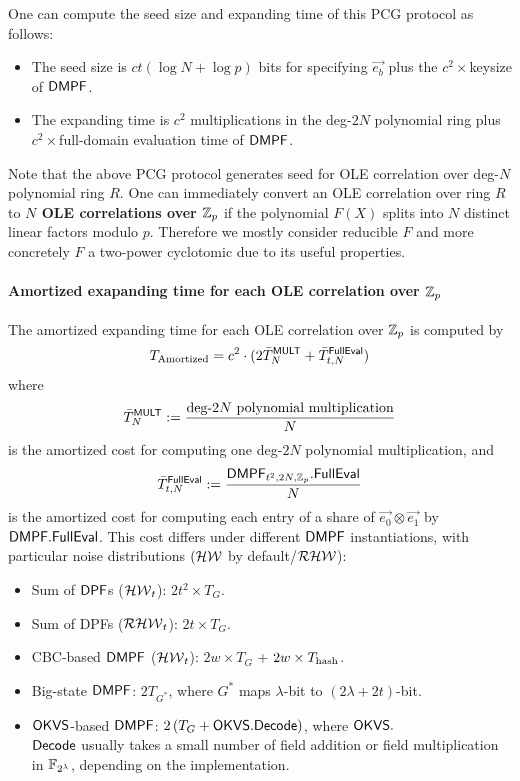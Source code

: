 One can compute the seed size and expanding time of this PCG protocol as follows: 
\begin{itemize}
    \item The seed size is $ct(\log N+\log p)$ bits for specifying $\vec{e_b}$ plus the $c^2\times $keysize of ${\sf DMPF}$. 
    \item The expanding time is $c^2$ multiplications in the deg-$2N$ polynomial ring  plus $c^2\times$full-domain evaluation time of ${\sf DMPF}$. 
\end{itemize}

\begin{remark}\label{rem:use_reducible_ring}
    Note that the above PCG protocol generates seed for OLE correlation over deg-$N$ polynomial ring $R$. One can immediately convert an OLE correlation over ring $R$ to \textbf{$N$ OLE correlations over $\mathbb{Z}_p$} if the polynomial $F(X)$ splits into $N$ distinct linear factors modulo $p$\cite{cryptoeprint:2022/1035}. Therefore we mostly consider reducible $F$ and more concretely $F$ a two-power cyclotomic due to its useful properties. 
\end{remark}

\paragraph{Amortized exapanding time for each OLE correlation over $\mathbb{Z}_p$}The amortized expanding time for each OLE correlation over $\mathbb{Z}_p$ is computed by 
\[
  T_\text{Amortized} = c^2\cdot(2\bar{T}^{\sf MULT}_{N} + \bar{T}^{\sf FullEval}_{t,N})
\]
where 
\[
  \bar{T}^{\sf MULT}_{N} := \frac{\text{deg-}2N\text{ polynomial multiplication}}{N}
\]
is the amortized cost for computing one deg-$2N$ polynomial multiplication, and 
\[
  \bar{T}^{\sf FullEval}_{t,N}:=\frac{{\sf DMPF}_{t^2, 2N, \mathbb{Z}_p}.{\sf FullEval}}{N}
\]
is the amortized cost for computing each entry of a share of $\vec{e_0}\otimes\vec{e_1}$ by  ${\sf DMPF}.{\sf FullEval}$. This cost differs under different ${\sf DMPF}$ instantiations, with particular noise distributions $(\mathcal{HW}$ by default/$ \mathcal{RHW}$): 
\begin{itemize}
  \item Sum of ${\sf DPF}$s ($\mathcal{HW}_t$): $2t^2\times T_G$.
  \item Sum of DPFs ($\mathcal{RHW}_t$): $2t\times T_G$.
  \item CBC-based ${\sf DMPF}$ ($\mathcal{HW}_t$): $2w\times T_G$ + $2w\times T_{\rm hash}$.
  \item Big-state ${\sf DMPF}$: $2T_{G^*}$, where $G^*$ maps $\lambda$-bit to $(2\lambda+2t)$-bit. 
  \item ${\sf OKVS}$-based ${\sf DMPF}$: $2\left(T_G + {\sf OKVS}.{\sf Decode}\right)$, where ${\sf OKVS}.$\\${\sf Decode}$ usually takes a small number of field addition or field multiplication in $\mathbb{F}_{2^\lambda}$, depending on the implementation. 
\end{itemize}

